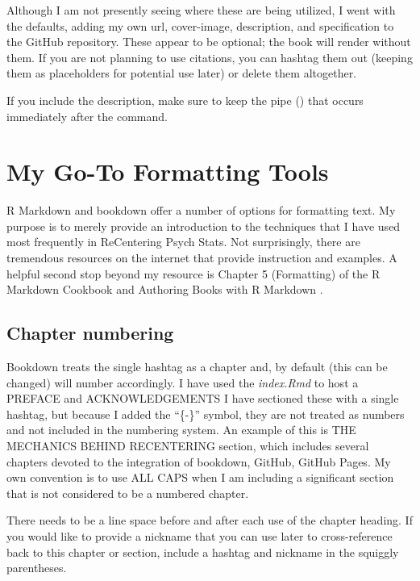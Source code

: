 \documentclass[
]{book}
\begin{document}
Although I am not presently seeing where these are being utilized, I went with the defaults, adding my own url, cover-image, description, and specification to the GitHub repository. These appear to be optional; the book will render without them. If you are not planning to use citations, you can hashtag them out (keeping them as placeholders for potential use later) or delete them altogether.

If you include the description, make sure to keep the pipe (\textbar) that occurs immediately after the command.

\hypertarget{my-go-to-formatting-tools}{%
\section{My Go-To Formatting Tools}\label{my-go-to-formatting-tools}}

R Markdown and bookdown offer a number of options for formatting text. My purpose is to merely provide an introduction to the techniques that I have used most frequently in ReCentering Psych Stats. Not surprisingly, there are tremendous resources on the internet that provide instruction and examples. A helpful second stop beyond my resource is Chapter 5 (Formatting) of the R Markdown Cookbook \citep{xie_r_2021} and Authoring Books with R Markdown \citep{xie_r_2021}.

\hypertarget{chapter-numbering}{%
\subsection{Chapter numbering}\label{chapter-numbering}}

Bookdown treats the single hashtag as a chapter and, by default (this can be changed) will number accordingly. I have used the \emph{index.Rmd} to host a PREFACE and ACKNOWLEDGEMENTS I have sectioned these with a single hashtag, but because I added the ``\{-\}'' symbol, they are not treated as numbers and not included in the numbering system. An example of this is THE MECHANICS BEHIND RECENTERING section, which includes several chapters devoted to the integration of bookdown, GitHub, GitHub Pages. My own convention is to use ALL CAPS when I am including a significant section that is not considered to be a numbered chapter.

There needs to be a line space before and after each use of the chapter heading. If you would like to provide a nickname that you can use later to cross-reference back to this chapter or section, include a hashtag and nickname in the squiggly parentheses.
\end{document}
